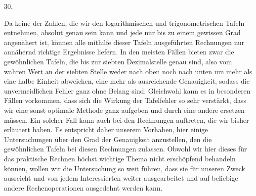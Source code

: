 \par{}
\begin{center}
30.
\end{center}
Da keine der Zahlen, die wir den logarithmischen und trigonometrischen Tafeln entnehmen, absolut genau sein kann und jede nur bis zu einem gewissen Grad angenähert ist, können alle mithilfe dieser Tafeln ausgeführten Rechnungen nur annähernd richtige Ergebnisse liefern. In den meisten Fällen bieten zwar die gewöhnlichen Tafeln, die bis zur siebten Dezimalstelle genau sind, also vom wahren Wert an der siebten Stelle weder nach oben noch nach unten um mehr als eine halbe Einheit abweichen, eine mehr als ausreichende Genauigkeit, sodass die unvermeidlichen Fehler ganz ohne Belang sind. Gleichwohl kann es in besonderen Fällen vorkommen, dass sich die Wirkung der Tafelfehler so sehr verstärkt, dass wir eine sonst optimale Methode ganz aufgeben und durch eine andere ersetzen müssen. Ein solcher Fall kann auch bei den Rechnungen auftreten, die wir bisher erläutert haben. Es entspricht daher unserem Vorhaben, hier einige Untersuchungen über den Grad der Genauigkeit anzustellen, den die gewöhnlichen Tafeln bei diesen Rechnungen zulassen. Obwohl wir hier dieses für das praktische Rechnen höchst wichtige Thema nicht erschöpfend behandeln können, wollen wir die Untersuchung so weit führen, dass sie für unseren Zweck ausreicht und von jedem Interessierten weiter ausgearbeitet und auf beliebige andere Rechenoperationen ausgedehnt werden kann.

